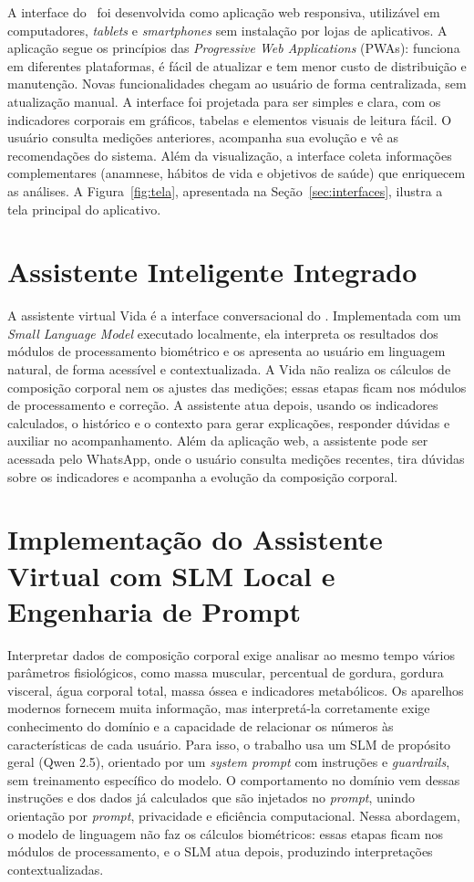 A interface do \sintonia\ foi desenvolvida como aplicação web responsiva, utilizável em
computadores, \emph{tablets} e \emph{smartphones} sem instalação por lojas de aplicativos.
A aplicação segue os princípios das \emph{Progressive Web Applications} (PWAs): funciona em
diferentes plataformas, é fácil de atualizar e tem menor custo de distribuição e
manutenção. Novas funcionalidades chegam ao usuário de forma centralizada, sem atualização
manual. A interface foi projetada para ser simples e clara, com os indicadores corporais em
gráficos, tabelas e elementos visuais de leitura fácil. O usuário consulta medições
anteriores, acompanha sua evolução e vê as recomendações do sistema. Além da visualização,
a interface coleta informações complementares (anamnese, hábitos de vida e objetivos de
saúde) que enriquecem as análises. A Figura~\ref{fig:tela}, apresentada na
Seção~\ref{sec:interfaces}, ilustra a tela principal do aplicativo.

\section{Assistente Inteligente Integrado}

A assistente virtual Vida é a interface conversacional do \sintonia. Implementada com um
\emph{Small Language Model} executado localmente, ela interpreta os resultados dos módulos
de processamento biométrico e os apresenta ao usuário em linguagem natural, de forma
acessível e contextualizada. A Vida não realiza os cálculos de composição corporal nem os
ajustes das medições; essas etapas ficam nos módulos de processamento e correção. A
assistente atua depois, usando os indicadores calculados, o histórico e o contexto para
gerar explicações, responder dúvidas e auxiliar no acompanhamento. Além da aplicação web, a
assistente pode ser acessada pelo WhatsApp, onde o usuário consulta medições recentes, tira
dúvidas sobre os indicadores e acompanha a evolução da composição corporal.

\section{Implementação do Assistente Virtual com SLM Local e Engenharia de Prompt}

Interpretar dados de composição corporal exige analisar ao mesmo tempo vários parâmetros
fisiológicos, como massa muscular, percentual de gordura, gordura visceral, água corporal
total, massa óssea e indicadores metabólicos. Os aparelhos modernos fornecem muita
informação, mas interpretá-la corretamente exige conhecimento do domínio e a capacidade de
relacionar os números às características de cada usuário. Para isso, o trabalho usa um SLM de
propósito geral (Qwen 2.5), orientado por um \emph{system prompt} com instruções e
\emph{guardrails}, sem treinamento específico do modelo. O comportamento no domínio vem
dessas instruções e dos dados já calculados que são injetados no \emph{prompt}, unindo
orientação por \emph{prompt}, privacidade e eficiência computacional. Nessa abordagem, o
modelo de linguagem não faz os cálculos biométricos: essas etapas ficam nos módulos de
processamento, e o SLM atua depois, produzindo interpretações contextualizadas.

